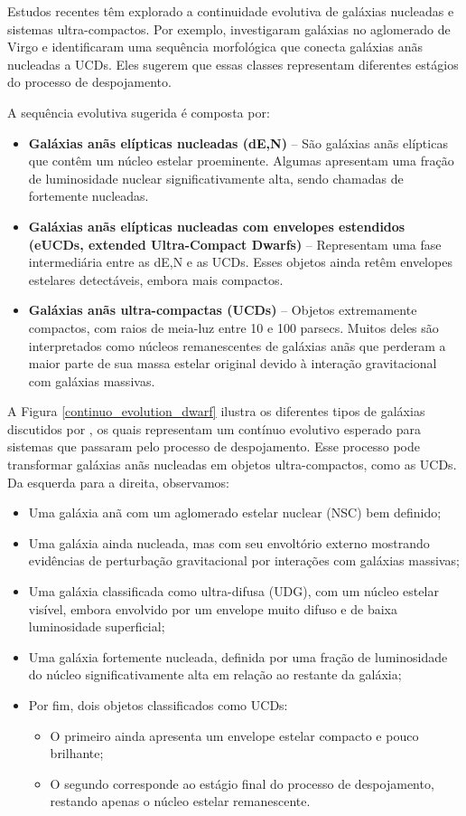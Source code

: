 Estudos recentes têm explorado a continuidade evolutiva de galáxias nucleadas e sistemas ultra-compactos. Por exemplo, \cite{Wang_2023} investigaram galáxias no aglomerado de Virgo e identificaram uma sequência morfológica que conecta galáxias anãs nucleadas a UCDs. Eles sugerem que essas classes representam diferentes estágios do processo de despojamento.

\noindent A sequência evolutiva sugerida é composta por:

\begin{itemize}
    \item \textbf{Galáxias anãs elípticas nucleadas (dE,N)} – São galáxias anãs elípticas que contêm um núcleo estelar proeminente. Algumas apresentam uma fração de luminosidade nuclear significativamente alta, sendo chamadas de fortemente nucleadas.
    \item \textbf{Galáxias anãs elípticas nucleadas com envelopes estendidos (eUCDs, extended Ultra-Compact Dwarfs)} – Representam uma fase intermediária entre as dE,N e as UCDs. Esses objetos ainda retêm envelopes estelares detectáveis, embora mais compactos.
    \item \textbf{Galáxias anãs ultra-compactas (UCDs)} – Objetos extremamente compactos, com raios de meia-luz entre 10 e 100 parsecs. Muitos deles são interpretados como núcleos remanescentes de galáxias anãs que perderam a maior parte de sua massa estelar original devido à interação gravitacional com galáxias massivas.
\end{itemize}


A Figura \ref{continuo_evolution_dwarf} ilustra os diferentes tipos de galáxias discutidos por \cite{Wang_2023}, os quais representam um contínuo evolutivo esperado para sistemas que passaram pelo processo de despojamento. Esse processo pode transformar galáxias anãs nucleadas em objetos ultra-compactos, como as UCDs. Da esquerda para a direita, observamos:

\begin{itemize}
    \item Uma galáxia anã com um aglomerado estelar nuclear (NSC) bem definido;
    \item Uma galáxia ainda nucleada, mas com seu envoltório externo mostrando evidências de perturbação gravitacional por interações com galáxias massivas;
    \item Uma galáxia classificada como ultra-difusa (\ac{UDG}), com um núcleo estelar visível, embora envolvido por um envelope muito difuso e de baixa luminosidade superficial;
    \item Uma galáxia fortemente nucleada, definida por uma fração de luminosidade do núcleo significativamente alta em relação ao restante da galáxia;
    \item Por fim, dois objetos classificados como UCDs:
    \begin{itemize}
        \item O primeiro ainda apresenta um envelope estelar compacto e pouco brilhante;
        \item O segundo corresponde ao estágio final do processo de despojamento, restando apenas o núcleo estelar remanescente.
    \end{itemize}
\end{itemize}


